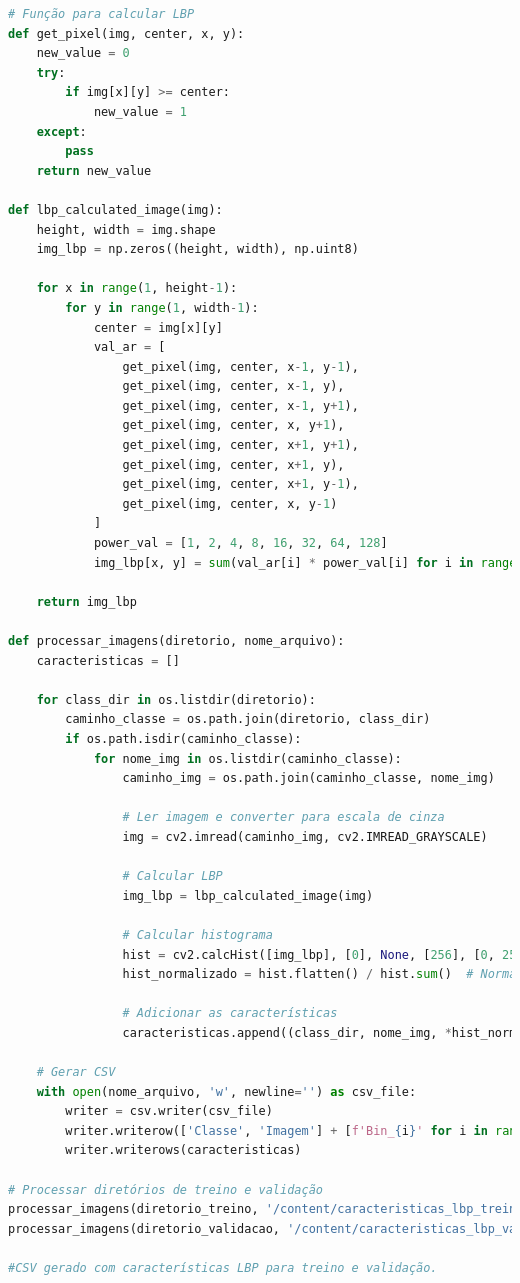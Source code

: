 \begin{lstlisting}[language=Python, style=input]
# Função para calcular LBP
def get_pixel(img, center, x, y):
    new_value = 0
    try:
        if img[x][y] >= center:
            new_value = 1
    except:
        pass
    return new_value

def lbp_calculated_image(img):
    height, width = img.shape
    img_lbp = np.zeros((height, width), np.uint8)

    for x in range(1, height-1):
        for y in range(1, width-1):
            center = img[x][y]
            val_ar = [
                get_pixel(img, center, x-1, y-1),
                get_pixel(img, center, x-1, y),
                get_pixel(img, center, x-1, y+1),
                get_pixel(img, center, x, y+1),
                get_pixel(img, center, x+1, y+1),
                get_pixel(img, center, x+1, y),
                get_pixel(img, center, x+1, y-1),
                get_pixel(img, center, x, y-1)
            ]
            power_val = [1, 2, 4, 8, 16, 32, 64, 128]
            img_lbp[x, y] = sum(val_ar[i] * power_val[i] for i in range(len(val_ar)))

    return img_lbp

def processar_imagens(diretorio, nome_arquivo):
    caracteristicas = []

    for class_dir in os.listdir(diretorio):
        caminho_classe = os.path.join(diretorio, class_dir)
        if os.path.isdir(caminho_classe):
            for nome_img in os.listdir(caminho_classe):
                caminho_img = os.path.join(caminho_classe, nome_img)

                # Ler imagem e converter para escala de cinza
                img = cv2.imread(caminho_img, cv2.IMREAD_GRAYSCALE)

                # Calcular LBP
                img_lbp = lbp_calculated_image(img)

                # Calcular histograma
                hist = cv2.calcHist([img_lbp], [0], None, [256], [0, 256])
                hist_normalizado = hist.flatten() / hist.sum()  # Normalizar

                # Adicionar as características
                caracteristicas.append((class_dir, nome_img, *hist_normalizado))

    # Gerar CSV
    with open(nome_arquivo, 'w', newline='') as csv_file:
        writer = csv.writer(csv_file)
        writer.writerow(['Classe', 'Imagem'] + [f'Bin_{i}' for i in range(256)])  # Cabeçalho
        writer.writerows(caracteristicas)

# Processar diretórios de treino e validação
processar_imagens(diretorio_treino, '/content/caracteristicas_lbp_treino.csv')
processar_imagens(diretorio_validacao, '/content/caracteristicas_lbp_validacao.csv')

#CSV gerado com características LBP para treino e validação.
\end{lstlisting}

